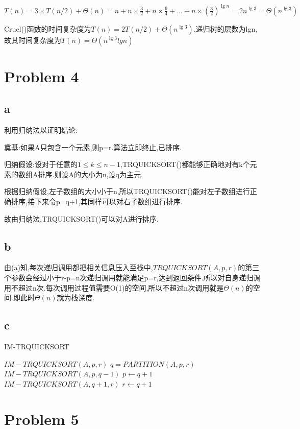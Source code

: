 \documentclass[12pt,a4paper,fontset=none]{ctexart}
\begin{document}
$T(n)=3\times T(n/2)+\Theta(n)=n+n\times \frac{3}{2}+n\times \frac{9}{4}+...+n\times (\frac{3}{2})^{\lg n}=2n^{\lg 3}=\Theta (n^{\lg 3})$

Cruel()函数的时间复杂度为$T(n)=2T(n/2)+\Theta(n^{\lg3})$,递归树的层数为lgn,故其时间复杂度为$T(n)=\Theta (n^{\lg3}lgn)$
\section*{Problem 4}
\subsection*{a}
利用归纳法以证明结论:

奠基:如果A只包含一个元素,则p=r.算法立即终止,已排序.

归纳假设:设对于任意的$1\leq k \leq n-1$,TRQUICKSORT()都能够正确地对有k个元素的数组A排序.则设A的大小为n,设q为主元.

根据归纳假设,左子数组的大小小于n,所以TRQUICKSORT()能对左子数组进行正确排序,接下来令p=q+1,其同样可以对右子数组进行排序.

故由归纳法,TRQUICKSORT()可以对A进行排序.
\subsection*{b}

由(a)知,每次递归调用都把相关信息压入至栈中,$TRQUICKSORT(A,p,r)$的第三个参数会经过小于r-p=n次递归调用就能满足p=r,达到返回条件.所以对自身递归调用不超过n次.每次调用过程值需要O(1)的空间,所以不超过n次调用就是$\Theta(n)$的空间.即此时$\Theta(n)$就为栈深度.

\subsection*{c}
\begin{algorithm}
    \caption{IM-TRQUICKSORT}
    \label{alg4}
    \begin{algorithmic}
        \State $IM-TRQUICKSORT(A,p,r)$
        \State $q=PARTITION(A,p,r)$
        \State $IM-TRQUICKSORT(A,p,q-1)$
        \State $p\gets q+1$
        \Else
        \State $IM-TRQUICKSORT(A,q+1,r)$
        \State $r\gets q+1$
        \EndIf
        \EndWhile
    \end{algorithmic}
\end{algorithm}
\section*{Problem 5}
\end{document}
